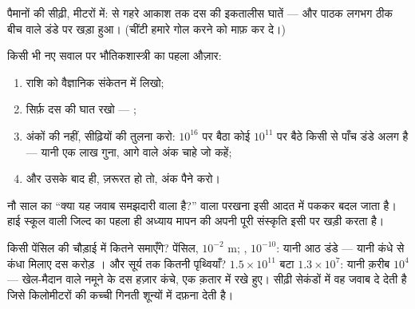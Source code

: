 \begin{omfigure}

{\small पैमानों की सीढ़ी, मीटरों में:  से गहरे आकाश तक दस की
इकतालीस घातें --- और पाठक लगभग ठीक बीच वाले डंडे पर खड़ा हुआ। (चींटी
हमारे गोल करने को माफ़ कर दे।)}
\end{omfigure}

\begin{method}[परिमाण की कोटियों में सोचना]\label{met:g9:atoms-to-galaxies:oom}
किसी भी नए सवाल पर भौतिकशास्त्री का पहला औज़ार:
\begin{enumerate}
  \item राशि को वैज्ञानिक संकेतन में लिखो;
  \item सिर्फ़ दस की घात रखो --- \emph{}%
        ;
  \item अंकों की नहीं, सीढ़ियों की तुलना करो: $10^{16}$  पर बैठा
        कोई  $10^{11}$ पर बैठे किसी  से पाँच डंडे अलग है ---
        यानी एक लाख गुना, आगे वाले अंक चाहे जो कहें;
  \item और उसके बाद ही, ज़रूरत हो तो, अंक पैने करो।
\end{enumerate}
नौ साल का ``क्या यह जवाब समझदारी वाला है?'' वाला परखना इसी आदत में
पककर बदल जाता है। हाई स्कूल वाली जिल्द का पहला ही अध्याय मापन की अपनी
पूरी संस्कृति इसी पर खड़ी करता है।
\end{method}

\begin{example}[सीढ़ी वाला अंकगणित]\label{ex:g9:atoms-to-galaxies:arithmetic}
किसी पेंसिल की चौड़ाई में कितने  समाएँगे? पेंसिल, $10^{-2}$
\unit{m}; , $10^{-10}$: यानी आठ डंडे --- यानी कंधे से कंधा
मिलाए दस करोड़ । और सूर्य तक कितनी पृथ्वियाँ? $1.5 \times
10^{11}$ बटा $1.3 \times 10^{7}$: यानी क़रीब $10^{4}$ ---
खेल-मैदान वाले नमूने के दस हज़ार कंचे, एक क़तार में रखे हुए। सीढ़ी
सेकंडों में वह जवाब दे देती है जिसे किलोमीटरों की कच्ची गिनती शून्यों
में दफ़ना देती है।
\end{example}

